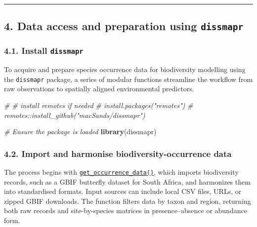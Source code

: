 \documentclass[
]{article}
\newenvironment{Shaded}{\begin{snugshade}}{\end{snugshade}}
\newcommand{\CommentTok}[1]{\textcolor[rgb]{0.56,0.35,0.01}{\textit{#1}}}
\newcommand{\FunctionTok}[1]{\textcolor[rgb]{0.13,0.29,0.53}{\textbf{#1}}}
\newcommand{\NormalTok}[1]{#1}
\begin{document}
\begin{center}\rule{0.5\linewidth}{0.5pt}\end{center}

\hypertarget{data-access-and-preparation-using-dissmapr}{%
\subsection{\texorpdfstring{4. Data access and preparation using
\texttt{dissmapr}}{4. Data access and preparation using dissmapr}}\label{data-access-and-preparation-using-dissmapr}}

\hypertarget{install-dissmapr}{%
\subsubsection{\texorpdfstring{4.1. Install
\texttt{dissmapr}}{4.1. Install dissmapr}}\label{install-dissmapr}}

To acquire and prepare species occurrence data for biodiversity
modelling using the \texttt{dissmapr} package, a series of modular
functions streamline the workflow from raw observations to spatially
aligned environmental predictors.

\begin{Shaded}
\begin{Highlighting}[]
\CommentTok{\# \# install remotes if needed}
\CommentTok{\# install.packages("remotes")}
\CommentTok{\# remotes::install\_github("macSands/dissmapr")}

\CommentTok{\# Ensure the package is loaded}
\FunctionTok{library}\NormalTok{(dissmapr)}
\end{Highlighting}
\end{Shaded}

\hypertarget{import-and-harmonise-biodiversity-occurrence-data}{%
\subsubsection{4.2. Import and harmonise biodiversity-occurrence
data}\label{import-and-harmonise-biodiversity-occurrence-data}}

The process begins with
\href{https://macsands.github.io/dissmapr/reference/get_occurrence_data.html}{\texttt{get\_occurrence\_data()}},
which imports biodiversity records, such as a GBIF butterfly dataset for
South Africa, and harmonizes them into standardised formats. Input
sources can include local CSV files, URLs, or zipped GBIF downloads. The
function filters data by taxon and region, returning both raw records
and site-by-species matrices in presence--absence or abundance form.
\end{document}
